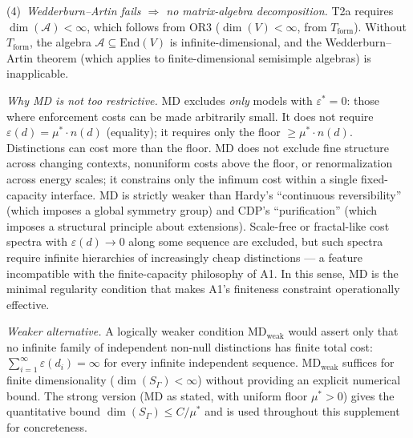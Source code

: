 \documentclass[11pt,a4paper]{article}
\theoremstyle{definition}
\newcommand{\eps}{\varepsilon}
\newcommand{\End}{\mathrm{End}}
\begin{document}
\begin{tcolorbox}[apfbox, title={MD: Uniform Per-Test Cost Floor (Regularity Condition)}]
\noindent(4)~\textit{Wedderburn--Artin fails $\Rightarrow$ no matrix-algebra decomposition.}  T2a requires $\dim(\mathcal{A}) < \infty$, which follows from OR3 ($\dim(V) < \infty$, from $T_{\mathrm{form}}$).  Without $T_{\mathrm{form}}$, the algebra $\mathcal{A} \subseteq \End(V)$ is infinite-dimensional, and the Wedderburn--Artin theorem (which applies to finite-dimensional semisimple algebras) is inapplicable.

\noindent\textit{Why MD is not too restrictive.}  MD excludes \emph{only} models with $\eps^* = 0$: those where enforcement costs can be made arbitrarily small.  It does not require $\eps(d) = \mu^* \cdot n(d)$ (equality); it requires only the floor $\ge \mu^* \cdot n(d)$.  Distinctions can cost more than the floor.  MD does not exclude fine structure across changing contexts, nonuniform costs above the floor, or renormalization across energy scales; it constrains only the infimum cost within a single fixed-capacity interface.  MD is strictly weaker than Hardy's ``continuous reversibility'' (which imposes a global symmetry group) and CDP's ``purification'' (which imposes a structural principle about extensions).  Scale-free or fractal-like cost spectra with $\eps(d) \to 0$ along some sequence are excluded, but such spectra require infinite hierarchies of increasingly cheap distinctions --- a feature incompatible with the finite-capacity philosophy of A1.  In this sense, MD is the minimal regularity condition that makes A1's finiteness constraint operationally effective.

\smallskip\noindent\textit{Weaker alternative.}  A logically weaker condition $\mathrm{MD}_{\mathrm{weak}}$ would assert only that no infinite family of independent non-null distinctions has finite total cost: $\sum_{i=1}^\infty \eps(d_i) = \infty$ for every infinite independent sequence.  $\mathrm{MD}_{\mathrm{weak}}$ suffices for finite dimensionality ($\dim(S_\Gamma) < \infty$) without providing an explicit numerical bound.  The strong version (MD as stated, with uniform floor $\mu^* > 0$) gives the quantitative bound $\dim(S_\Gamma) \le C/\mu^*$ and is used throughout this supplement for concreteness.


\end{tcolorbox}
\end{document}
